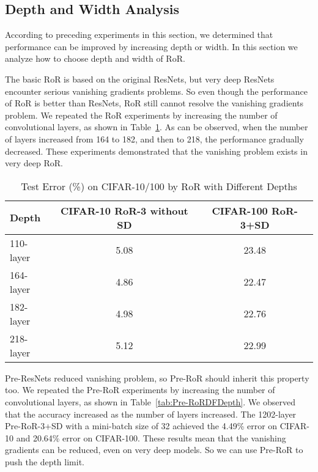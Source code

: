 \documentclass[journal]{IEEEtran}
\begin{document}
\subsection{Depth and Width Analysis}
According to preceding experiments in this section, we determined that performance can be improved by increasing depth or width. In this section we analyze how to choose depth and width of RoR.
\par 
The basic RoR is based on the original ResNets, but very deep ResNets encounter serious vanishing gradients problems. So even though the performance of RoR is better than ResNets, RoR still cannot resolve the vanishing gradients problem. We repeated the RoR experiments by increasing the number of convolutional layers, as shown in Table~\ref{tab:RoRDFDepth}. As can be observed, when the number of layers increased from 164 to 182, and then to 218, the performance gradually decreased. These experiments demonstrated that the vanishing problem exists in very deep RoR.
\begin{table}[!t]
\renewcommand{\arraystretch}{1.3}
\caption{Test Error (\%) on CIFAR-10/100 by RoR with Different Depths}
\label{tab:RoRDFDepth}
\centering
\begin{tabular}{|l|c|c|}
\hline
Depth           &CIFAR-10 RoR-3 without SD             &CIFAR-100 RoR-3+SD  \\ \hline\hline
110-layer       &5.08                                  &23.48               \\\hline
164-layer       &4.86                                  &22.47               \\\hline
182-layer       &4.98                                  &22.76               \\\hline
218-layer       &5.12                                  &22.99               \\\hline
\end{tabular}
\end{table}
\par 
Pre-ResNets reduced vanishing problem, so Pre-RoR should inherit this property too. We repeated the Pre-RoR experiments by increasing the number of convolutional layers, as shown in Table~\ref{tab:Pre-RoRDFDepth}. We observed that the accuracy increased as the number of layers increased. The 1202-layer Pre-RoR-3+SD with a mini-batch size of 32 achieved the 4.49\% error on CIFAR-10 and 20.64\% error on CIFAR-100. These results mean that the vanishing gradients can be reduced, even on very deep models. So we can use Pre-RoR to push the depth limit.
\end{document}

